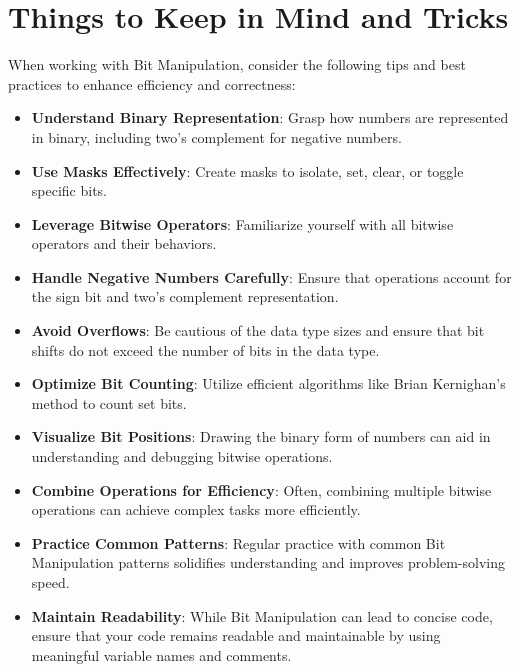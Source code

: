 \section*{Things to Keep in Mind and Tricks}

When working with Bit Manipulation, consider the following tips and best practices to enhance efficiency and correctness:

\begin{itemize}
    \item \textbf{Understand Binary Representation}: Grasp how numbers are represented in binary, including two's complement for negative numbers.
    
    \item \textbf{Use Masks Effectively}: Create masks to isolate, set, clear, or toggle specific bits.
    
    \item \textbf{Leverage Bitwise Operators}: Familiarize yourself with all bitwise operators and their behaviors.
    
    \item \textbf{Handle Negative Numbers Carefully}: Ensure that operations account for the sign bit and two's complement representation.
    
    \item \textbf{Avoid Overflows}: Be cautious of the data type sizes and ensure that bit shifts do not exceed the number of bits in the data type.
    
    \item \textbf{Optimize Bit Counting}: Utilize efficient algorithms like Brian Kernighan’s method to count set bits.
    
    \item \textbf{Visualize Bit Positions}: Drawing the binary form of numbers can aid in understanding and debugging bitwise operations.
    
    \item \textbf{Combine Operations for Efficiency}: Often, combining multiple bitwise operations can achieve complex tasks more efficiently.
    
    \item \textbf{Practice Common Patterns}: Regular practice with common Bit Manipulation patterns solidifies understanding and improves problem-solving speed.
    
    \item \textbf{Maintain Readability}: While Bit Manipulation can lead to concise code, ensure that your code remains readable and maintainable by using meaningful variable names and comments.
\end{itemize}

